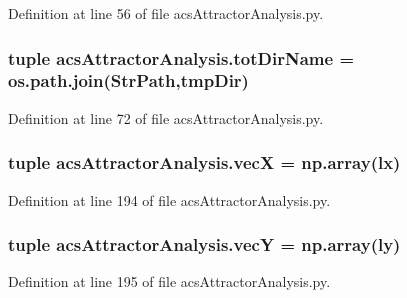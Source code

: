 Definition at line 56 of file acs\-Attractor\-Analysis.\-py.

\hypertarget{a00091_ad3caf9c42727aaab24f4ea4dae362fc9}{
\subsubsection[{tot\-Dir\-Name}]{\setlength{\rightskip}{0pt plus 5cm}tuple acs\-Attractor\-Analysis.\-tot\-Dir\-Name = os.\-path.\-join({\bf Str\-Path},tmp\-Dir)}}\label{a00091_ad3caf9c42727aaab24f4ea4dae362fc9}


Definition at line 72 of file acs\-Attractor\-Analysis.\-py.

\hypertarget{a00091_af20e9c92b7d977049b881882c0d1382c}{
\subsubsection[{vec\-X}]{\setlength{\rightskip}{0pt plus 5cm}tuple acs\-Attractor\-Analysis.\-vec\-X = np.\-array(lx)}}\label{a00091_af20e9c92b7d977049b881882c0d1382c}


Definition at line 194 of file acs\-Attractor\-Analysis.\-py.

\hypertarget{a00091_a691fb5bd87af2162b5acaf48ea4c06e7}{
\subsubsection[{vec\-Y}]{\setlength{\rightskip}{0pt plus 5cm}tuple acs\-Attractor\-Analysis.\-vec\-Y = np.\-array(ly)}}\label{a00091_a691fb5bd87af2162b5acaf48ea4c06e7}


Definition at line 195 of file acs\-Attractor\-Analysis.\-py.

